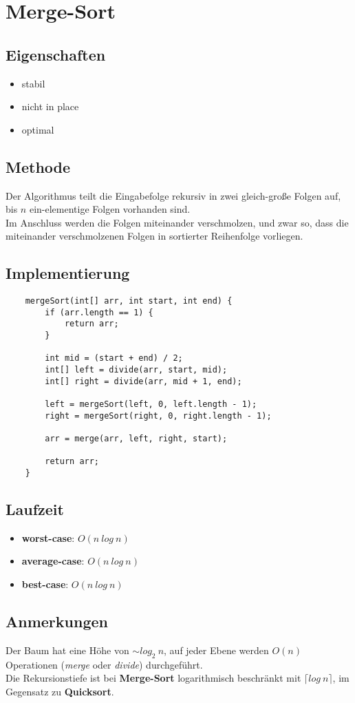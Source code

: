 \section{Merge-Sort}


\subsection{Eigenschaften}
\begin{itemize}
    \item stabil
    \item nicht in place
    \item optimal
\end{itemize}

\subsection{Methode}
Der Algorithmus teilt die Eingabefolge rekursiv in zwei gleich-große Folgen auf, bis $n$ ein-elementige Folgen vorhanden sind.\\
Im Anschluss werden die Folgen miteinander verschmolzen, und zwar so, dass die miteinander verschmolzenen Folgen in sortierter Reihenfolge vorliegen.\\


\subsection{Implementierung}
\begin{verbatim}
    mergeSort(int[] arr, int start, int end) {
        if (arr.length == 1) {
            return arr;
        }

        int mid = (start + end) / 2;
        int[] left = divide(arr, start, mid);
        int[] right = divide(arr, mid + 1, end);

        left = mergeSort(left, 0, left.length - 1);
        right = mergeSort(right, 0, right.length - 1);

        arr = merge(arr, left, right, start);

        return arr;
    }
\end{verbatim}


\subsection{Laufzeit}
\begin{itemize}
    \item \textbf{worst-case}: $O(n\ log\ n)$
    \item \textbf{average-case}: $O(n\ log\ n)$
    \item \textbf{best-case}: $O(n\ log\ n)$
\end{itemize}

\subsection{Anmerkungen}
Der Baum hat eine Höhe von $\sim log_2\ n$, auf jeder Ebene werden $O(n)$ Operationen (\textit{merge} oder \textit{divide}) durchgeführt.\\
Die Rekursionstiefe ist bei \textbf{Merge-Sort} logarithmisch beschränkt mit $\lceil log\ n \rceil$, im Gegensatz zu \textbf{Quicksort}.